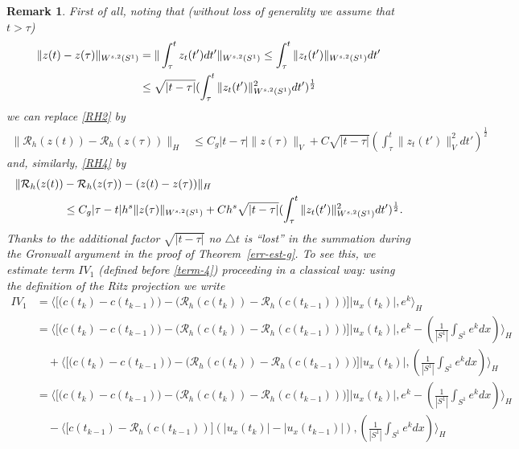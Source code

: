 \documentclass[a4paper,10pt]{article}
\newtheorem{rem}[cor]{Remark}
\numberwithin{equation}{section}
\begin{document}
\begin{rem}
First of all, noting that (without loss of generality we assume that $t > \tau$)
\begin{align}\label{buba}
\| z(t) - z(\tau) \|_{W^{s,2}(S^{1})} &=\|\int_{\tau}^{t} z_{t}(t') dt' \|_{W^{s,2}(S^{1})}\leq
\int_{\tau}^{t}\| z_{t}(t') \|_{W^{s,2}(S^{1})} dt' \notag \\
&\leq \sqrt{|t -\tau|} (\int_{\tau}^{t}\| z_{t}(t') \|_{W^{s,2}(S^{1})}^{2} dt')^{\frac{1}{2}}
\end{align}
we can replace \eqref{RH2} by 
\begin{align}\label{RH2-reg}
\| \mathcal{R}_{h} (z(t)) -\mathcal{R}_{h} (z(\tau)) \|_{H}& \leq C_{g} |t -\tau| \| z(\tau)\|_{V}+
 C \sqrt{|t -\tau|} (\int_{\tau}^{t}\| z_{t}(t') \|_{V}^{2} dt')^{\frac{1}{2}}
\end{align}
and, similarly, \eqref{RH4} by
\begin{align}\label{RH4-reg}
\| \mathcal{R}_{h} (z(t))& -\mathcal{R}_{h} (z(\tau)) - (z(t) -z(\tau)) \|_{H} \\
&\leq C_{g}|\tau-t|h^{s}\| z(\tau)\|_{W^{s,2}(S^{1})} + Ch^{s}
 \sqrt{|t -\tau|} (\int_{\tau}^{t}\| z_{t}(t') \|_{W^{s,2}(S^{1})}^{2} dt')^{\frac{1}{2}} .\notag
\end{align}
Thanks to the additional factor $\sqrt{|t -\tau|}$ no $\triangle t$ is ``lost'' in the summation during the Gronwall argument in the proof of Theorem~\ref{err-est-g}.
To see this, we estimate term $IV_{1}$ (defined before \eqref{term-4}) proceeding in a classical way: 
using the definition of the Ritz projection we write
\begin{align*}
IV_{1}&=\langle \Big[ \big( c(t_{k}) - c(t_{k-1})\big) -\big(\mathcal{R}_{h}(c(t_{k})) - \mathcal{R}_{h}(c(t_{k-1})) \big) \Big]|u_{x}(t_{k})| , e^{k}\rangle_{H} \\
&=\langle \Big[ \big( c(t_{k}) - c(t_{k-1})\big) -\big(\mathcal{R}_{h}(c(t_{k})) - \mathcal{R}_{h}(c(t_{k-1})) \big) \Big]|u_{x}(t_{k})| , e^{k}- (\frac{1}{|S^{1}|} \int_{S^{1}} e^{k} dx)\rangle_{H} \\
& \quad +\langle \Big[ \big( c(t_{k}) - c(t_{k-1})\big) -\big(\mathcal{R}_{h}(c(t_{k})) - \mathcal{R}_{h}(c(t_{k-1})) \big) \Big]|u_{x}(t_{k})| , (\frac{1}{|S^{1}|} \int_{S^{1}} e^{k} dx)\rangle_{H} \\
&=\langle \Big[ \big( c(t_{k}) - c(t_{k-1})\big) -\big(\mathcal{R}_{h}(c(t_{k})) - \mathcal{R}_{h}(c(t_{k-1})) \big) \Big]|u_{x}(t_{k})| , e^{k}- (\frac{1}{|S^{1}|} \int_{S^{1}} e^{k} dx)\rangle_{H} \\
& \quad -\langle \Big[ c(t_{k-1}) - \mathcal{R}_{h}(c(t_{k-1})) \Big](|u_{x}(t_{k})|- |u_{x}(t_{k-1})|) , (\frac{1}{|S^{1}|} \int_{S^{1}} e^{k} dx)\rangle_{H} \\

\end{align*}
\end{rem}
\end{document}
